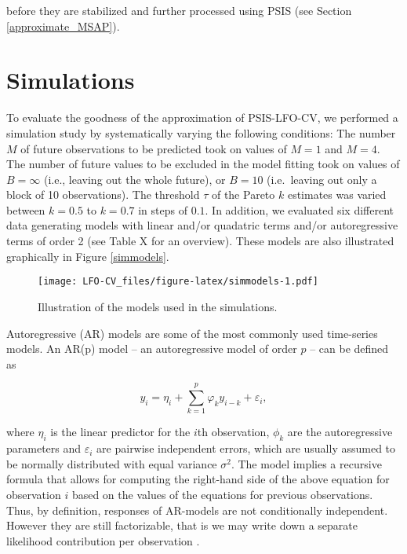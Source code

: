 \documentclass[american,]{article}
\begin{document}
before they are stabilized and further processed using PSIS (see Section
\ref{approximate_MSAP}).

\hypertarget{simulations}{%
\section{Simulations}\label{simulations}}

To evaluate the goodness of the approximation of PSIS-LFO-CV, we
performed a simulation study by systematically varying the following
conditions: The number \(M\) of future observations to be predicted took
on values of \(M = 1\) and \(M = 4\). The number of future values to be
excluded in the model fitting took on values of \(B = \infty\) (i.e.,
leaving out the whole future), or \(B = 10\) (i.e.~leaving out only a
block of 10 observations). The threshold \(\tau\) of the Pareto \(k\)
estimates was varied between \(k = 0.5\) to \(k = 0.7\) in steps of
\(0.1\). In addition, we evaluated six different data generating models
with linear and/or quadatric terms and/or autoregressive terms of order
2 (see Table X for an overview). These models are also illustrated
graphically in Figure \ref{simmodels}.

\begin{figure}
\centering
\texttt{[image: LFO-CV\_files/figure-latex/simmodels-1.pdf]}
\caption{Illustration of the models used in the simulations.}
\end{figure}

Autoregressive (AR) models are some of the most commonly used
time-series models. An AR(p) model -- an autoregressive model of order
\(p\) -- can be defined as

\begin{equation}
y_i = \eta_i + \sum_{k = 1}^p \varphi_k y_{i - k} + \varepsilon_i,
\end{equation}

where \(\eta_i\) is the linear predictor for the \(i\)th observation,
\(\phi_k\) are the autoregressive parameters and \(\varepsilon_i\) are
pairwise independent errors, which are usually assumed to be normally
distributed with equal variance \(\sigma^2\). The model implies a
recursive formula that allows for computing the right-hand side of the
above equation for observation \(i\) based on the values of the
equations for previous observations. Thus, by definition, responses of
AR-models are not conditionally independent. However they are still
factorizable, that is we may write down a separate likelihood
contribution per observation \citep[see][ for more discussion on
factorizability of statistical models]{buerkner:non-factorizable}.
\end{document}

